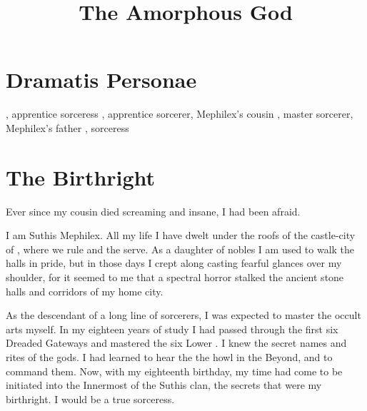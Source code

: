 \documentclass
  [a4paper,
   12pt,
   oneside
  ]%
  {article}
\title{The Amorphous God}
\begin{document}
  \stuffatthebeginning
  \setcounter{page}{1}















\section*{Dramatis Personae}
\begin{dramatispersonae}
  , 
    apprentice sorceress
  , 
    apprentice sorcerer, Mephilex's cousin
  , 
    master sorcerer, Mephilex's father
  , 
    sorceress
\end{dramatispersonae}















\section{The Birthright}
Ever since my cousin died screaming and insane, I had been afraid. 

I am Suthis Mephilex. 
All my life I have dwelt under the roofs of the castle-city of \Yormis, where we \scathae rule and the \humans serve.
As a daughter of nobles I am used to walk the halls in pride, but in those days I crept along casting fearful glances over my shoulder, for it seemed to me that a spectral horror stalked the ancient stone halls and corridors of my home city. 

As the descendant of a long line of \rethyax sorcerers, I was expected to master the occult arts myself. 
In my eighteen years of study I had passed through the first six Dreaded Gateways and mastered the six Lower \Arcana. 
I knew the secret names and rites of the gods. 
I had learned to hear the the \daemons howl in the Beyond, and to command them. 
Now, with my eighteenth birthday, my time had come to be initiated into the Innermost \Arcana of the Suthis clan, the secrets that were my birthright. 
I would be a true \rethyax sorceress.
\end{document}
